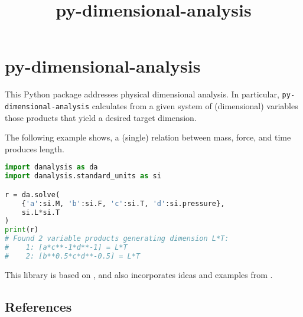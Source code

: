 \documentclass[11pt]{article}
\title{py-dimensional-analysis}
\date{}
\begin{document}
\maketitle

\section{py-dimensional-analysis}
This Python package addresses physical dimensional analysis. In particular, \texttt{py-dimensional-analysis} calculates from a given system of (dimensional) variables those products that yield a desired target dimension.


The following example shows, a (single) relation between mass, force, and time produces length.

\begin{lstlisting}[language=Python]
import danalysis as da
import danalysis.standard_units as si

r = da.solve(
    {'a':si.M, 'b':si.F, 'c':si.T, 'd':si.pressure}, 
    si.L*si.T
)
print(r)
# Found 2 variable products generating dimension L*T:
#    1: [a*c**-1*d**-1] = L*T
#    2: [b**0.5*c*d**-0.5] = L*T
\end{lstlisting}

This library is based on \cite{szirtes2007applied}, and also incorporates ideas and examples from \cite{santiago2019first, sonin2001dimensional}.

\subsection{References}

\begingroup
\renewcommand{\section}[2]{}%

\endgroup
\end{document}
